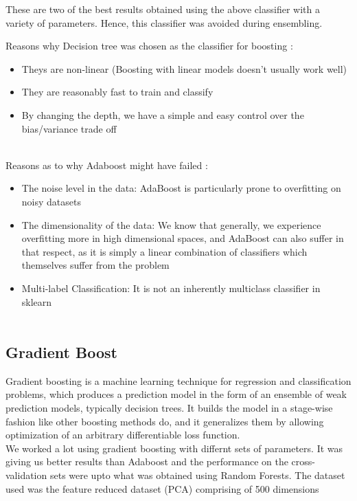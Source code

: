 \documentclass[12pt]{report}
\begin{document}
These are two of the best results obtained using the above classifier with a variety of parameters. Hence, this classifier was avoided during ensembling.

\newpage

Reasons why Decision tree was chosen as the classifier for boosting :
\begin{itemize}
    \item Theys are non-linear (Boosting with linear models doesn't usually work well)
    \item They are reasonably fast to train and classify
    \item By changing the depth, we have a simple and easy control over the bias/variance trade off\\\\
\end{itemize}

Reasons as to why Adaboost might have failed :
\begin{itemize}
    \item The noise level in the data: AdaBoost is particularly prone to overfitting on noisy datasets
    \item The dimensionality of the data: We know that generally, we experience overfitting more in high dimensional spaces, and AdaBoost can also suffer in that respect, as it is simply a linear combination of classifiers which themselves suffer from the problem
    \item Multi-label Classification: It is not an inherently multiclass classifier in sklearn\\\\
\end{itemize}

\subsection{Gradient Boost}
Gradient boosting is a machine learning technique for regression and classification problems, which produces a prediction model in the form of an ensemble of weak prediction models, typically decision trees. It builds the model in a stage-wise fashion like other boosting methods do, and it generalizes them by allowing optimization of an arbitrary differentiable loss function.\\

We worked a lot using gradient boosting with differnt sets of parameters. It was giving us better results than Adaboost and the performance on the cross-validation sets were upto what was obtained using Random Forests. The dataset used was the feature reduced dataset (PCA) comprising of 500 dimensions\\
\end{document}
